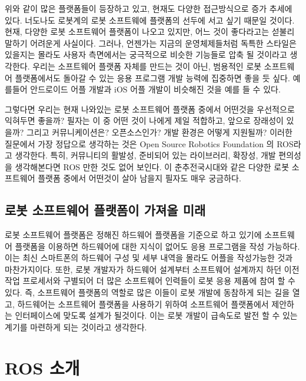 위와 같이 많은 플랫폼들이 등장하고 있고, 현재도 다양한 접근방식으로 증가 추세에 있다.
너도나도 로봇계의 로봇 소프트웨에 플랫폼의 선두에 서고 싶기 때문일 것이다.
현재, 다양한 로봇 소프트웨어 플랫폼이 나오고 있지만, 어느 것이 좋다라고는 섣불리 말하기 어려운게 사실이다.
그러나, 언젠가는 지금의 운영체제들처럼 독특한 스타일은 있을지는 몰라도 사용자 측면에서는 궁극적으로 비슷한 기능들로 압축 될 것이라고 생각한다.
우리는 소프트웨어 플랫폼 자체를 만드는 것이 아닌, 범용적인 로봇 소프트웨어 플랫폼에서도 돌아갈 수 있는 응용 프로그램 개발 능력에 집중하면 좋을 듯 싶다.
예를들어 안드로이드 어플 개발과 iOS 어플 개발이 비슷해진 것을 예를 들 수 있다. 

그렇다면 우리는 현재 나와있는 로봇 소프트웨어 플랫폼 중에서 어떤것을 우선적으로 익혀두면 좋을까?
필자는 이 중 어떤 것이 나에게 제일 적합하고, 앞으로 장래성이 있을까?
그리고 커뮤니케이션은?
오픈소스인가?
개발 환경은 어떻게 지원될까?
이러한 질문에서 가장 정답으로 생각하는 것은 Open Source Robotics Foundation 의 ROS라고 생각한다.
특히, 커뮤니티의 활발성, 준비되어 있는 라이브러리, 확장성, 개발 편의성을 생각해본다면 ROS 만한 것도 없어 보인다.
이 춘추전국시대와 같은 다양한 로봇 소프트웨어 플랫폼 중에서 어떤것이 살아 남을지 필자도 매우 궁금하다.

\subsection{로봇 소프트웨어 플랫폼이 가져올 미래}

로봇 소프트웨어 플랫폼은 정해진 하드웨어 플랫폼을 기준으로 하고 있기에 소프트웨어 플랫폼을 이용하면 하드웨어에 대한 지식이 없어도 응용 프로그램을 작성 가능하다.
이는 최신 스마트폰의 하드웨어 구성 및 세부 내역을 몰라도 어플을 작성가능한 것과 마찬가지이다.
또한, 로봇 개발자가 하드웨어 설계부터 소프트웨어 설계까지 하던 이전 작업 프로세서와 구별되어 더 많은 소프트웨어 인력들이 로봇 응용 제품에 참여 할 수 있다.
즉, 소프트웨어 플랫폼의 역할로 많은 이들이 로봇 개발에 동참하게 되는 길을 열고, 하드웨어는 소프트웨어 플랫폼을 사용하기 위하여 소프트웨어 플랫폼에서 제안하는 인터페이스에 맞도록 설계가 될것이다.
이는 로봇 개발이 급속도로 발전 할 수 있는 계기를 마련하게 되는 것이라고 생각한다.

\section{ROS 소개}

